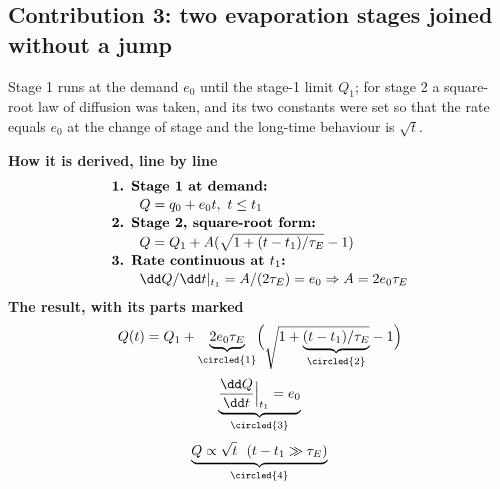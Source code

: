 \begin{pins}
\end{pins}

\subsection{Contribution 3: two evaporation stages joined without a jump}
\begin{derivation}
Stage 1 runs at the demand $e_0$ until the stage-1 limit $Q_1$; for stage 2 a square-root law of diffusion was taken, and its two constants were set so that the rate equals $e_0$ at the change of stage and the long-time behaviour is $\sqrt t$.
\end{derivation}
\begin{keyresult}
\begin{pencil}
{\small\noindent\textbf{How it is derived, line by line}
\[\begin{array}{@{}l@{}}\textbf{1. Stage 1 at demand:}\\[1pt]
\qquad Q=q_0+e_0t,\ t\le t_1\\[1pt]
\textbf{2. Stage 2, square-root form:}\\[1pt]
\qquad Q=Q_1+A(\sqrt{1+(t-t_1)/\tau_E}-1)\\[1pt]
\textbf{3. Rate continuous at } t_1\textbf{:}\\[1pt]
\qquad \dd Q/\dd t|_{t_1}=A/(2\tau_E)=e_0\Rightarrow A=2e_0\tau_E
\end{array}\]}
\noindent\textbf{The result, with its parts marked}
\[Q(t)=Q_1+\underbrace{2e_0\tau_E}_{\circled{1}}\Bigl(\sqrt{1+\underbrace{(t-t_1)/\tau_E}_{\circled{2}}}-1\Bigr)\]
\[\underbrace{\frac{\dd Q}{\dd t}\Big|_{t_1}=e_0}_{\circled{3}}\]
\[\underbrace{Q\propto\sqrt{t}\ \ (t-t_1\gg\tau_E)}_{\circled{4}}\]
\end{pencil}
\end{keyresult}
\begin{pins}
\end{pins}

